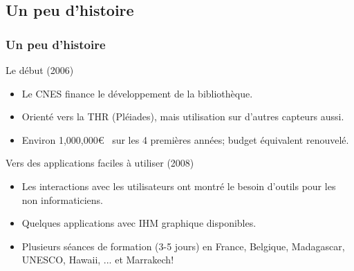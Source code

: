 \documentclass[compress]{beamer}
\begin{document}
\subsection{Un peu d'histoire}
\begin{frame}
\frametitle{Un peu d'histoire}
\begin{block}{Le début (2006)}
\scriptsize
\begin{itemize}
 \item Le CNES finance le développement de la bibliothèque.
 \item Orienté vers la THR (Pléiades), mais utilisation sur d'autres
   capteurs aussi.
 \item Environ 1,000,000\euro~ sur les 4 premières années; budget
   équivalent renouvelé.
\end{itemize}
\end{block}
\begin{block}{Vers des applications faciles à utiliser (2008)}
\scriptsize
\begin{itemize}
  \item Les interactions avec les utilisateurs ont montré le besoin
    d'outils pour les non informaticiens.
  \item Quelques applications avec IHM graphique disponibles.
  \item Plusieurs séances de formation (3-5 jours) en France,
    Belgique, Madagascar, UNESCO, Hawaii, ... et Marrakech!
\end{itemize}
\end{block}
\end{frame}
\end{document}
